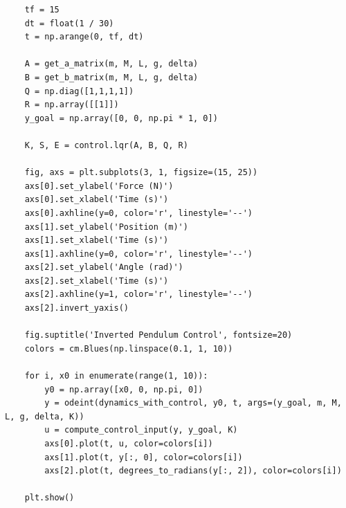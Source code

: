 \documentclass[a4 paper]{article}
\begin{document}
\begin{verbatim}
    tf = 15
    dt = float(1 / 30)
    t = np.arange(0, tf, dt)

    A = get_a_matrix(m, M, L, g, delta)
    B = get_b_matrix(m, M, L, g, delta)
    Q = np.diag([1,1,1,1])
    R = np.array([[1]])
    y_goal = np.array([0, 0, np.pi * 1, 0])

    K, S, E = control.lqr(A, B, Q, R)

    fig, axs = plt.subplots(3, 1, figsize=(15, 25))
    axs[0].set_ylabel('Force (N)')
    axs[0].set_xlabel('Time (s)')
    axs[0].axhline(y=0, color='r', linestyle='--')
    axs[1].set_ylabel('Position (m)')
    axs[1].set_xlabel('Time (s)')
    axs[1].axhline(y=0, color='r', linestyle='--')
    axs[2].set_ylabel('Angle (rad)')
    axs[2].set_xlabel('Time (s)')
    axs[2].axhline(y=1, color='r', linestyle='--')
    axs[2].invert_yaxis()

    fig.suptitle('Inverted Pendulum Control', fontsize=20)
    colors = cm.Blues(np.linspace(0.1, 1, 10))

    for i, x0 in enumerate(range(1, 10)):
        y0 = np.array([x0, 0, np.pi, 0])
        y = odeint(dynamics_with_control, y0, t, args=(y_goal, m, M, L, g, delta, K))
        u = compute_control_input(y, y_goal, K)
        axs[0].plot(t, u, color=colors[i])
        axs[1].plot(t, y[:, 0], color=colors[i])
        axs[2].plot(t, degrees_to_radians(y[:, 2]), color=colors[i])

    plt.show()
\end{verbatim}
\end{document}
